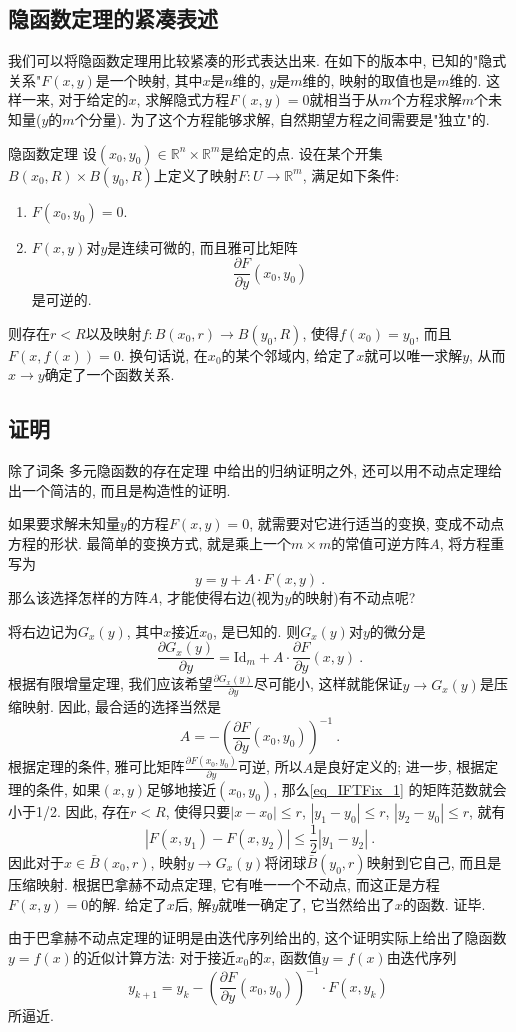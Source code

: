 

\subsection{隐函数定理的紧凑表述}
我们可以将隐函数定理用比较紧凑的形式表达出来. 在如下的版本中, 已知的"隐式关系"$F(x,y)$是一个映射, 其中$x$是$n$维的, $y$是$m$维的, 映射的取值也是$m$维的. 这样一来, 对于给定的$x$, 求解隐式方程$F(x,y)=0$就相当于从$m$个方程求解$m$个未知量($y$的$m$个分量). 为了这个方程能够求解, 自然期望方程之间需要是"独立"的.
\begin{theorem}{隐函数定理}
设$(x_0,y_0)\in\mathbb{R}^n\times\mathbb{R}^m$是给定的点. 设在某个开集$B(x_0,R)\times B(y_0,R)$上定义了映射$F:U\to\mathbb{R}^m$, 满足如下条件:
\begin{enumerate}
\item $F(x_0,y_0)=0$.
\item $F(x,y)$对$y$是连续可微的, 而且雅可比矩阵
$$
\frac{\partial F}{\partial y}(x_0,y_0)~
$$
是可逆的.
\end{enumerate}
则存在$r<R$以及映射$f:B(x_0,r)\to B(y_0,R)$, 使得$f(x_0)=y_0$, 而且$F(x,f(x))=0$. 换句话说, 在$x_0$的某个邻域内, 给定了$x$就可以唯一求解$y$, 从而$x\to y$确定了一个函数关系.
\end{theorem}

\subsection{证明}
除了词条 多元隐函数的存在定理 中给出的归纳证明之外, 还可以用不动点定理给出一个简洁的, 而且是构造性的证明.

如果要求解未知量$y$的方程$F(x,y)=0$, 就需要对它进行适当的变换, 变成不动点方程的形状. 最简单的变换方式, 就是乘上一个$m\times m$的常值可逆方阵$A$, 将方程重写为
$$
y=y+A\cdot F(x,y)~.
$$
那么该选择怎样的方阵$A$, 才能使得右边(视为$y$的映射)有不动点呢?

将右边记为$G_x(y)$, 其中$x$接近$x_0$, 是已知的. 则$G_x(y)$对$y$的微分是
\begin{equation}\label{eq_IFTFix_1}
\frac{\partial G_x(y)}{\partial y}=\mathrm{Id}_m+A\cdot\frac{\partial F}{\partial y}(x,y)~.
\end{equation}
根据有限增量定理, 我们应该希望$\frac{\partial G_x(y)}{\partial y}$尽可能小, 这样就能保证$y\to G_x(y)$是压缩映射. 因此, 最合适的选择当然是
$$
A=-\left(\frac{\partial F}{\partial y}(x_0,y_0)\right)^{-1}~.
$$
根据定理的条件, 雅可比矩阵$\frac{\partial F(x_0,y_0)}{\partial y}$可逆, 所以$A$是良好定义的; 进一步, 根据定理的条件, 如果$(x,y)$足够地接近$(x_0,y_0)$, 那么\autoref{eq_IFTFix_1} 的矩阵范数就会小于1/2. 因此, 存在$r<R$, 使得只要$|x-x_0|\leq r$, $|y_1-y_0|\leq r$, $|y_2-y_0|\leq r$, 就有
$$
|F(x,y_1)-F(x,y_2)|\leq\frac{1}{2}|y_1-y_2|~.
$$  
因此对于$x\in \bar B(x_0,r)$, 映射$y\to G_x(y)$将闭球$\bar B(y_0,r)$映射到它自己, 而且是压缩映射. 根据巴拿赫不动点定理, 它有唯一一个不动点, 而这正是方程$F(x,y)=0$的解. 给定了$x$后, 解$y$就唯一确定了, 它当然给出了$x$的函数. 证毕.

由于巴拿赫不动点定理的证明是由迭代序列给出的, 这个证明实际上给出了隐函数$y=f(x)$的近似计算方法: 对于接近$x_0$的$x$, 函数值$y=f(x)$由迭代序列
$$
y_{k+1}=y_k-\left(\frac{\partial F}{\partial y}(x_0,y_0)\right)^{-1}\cdot F(x,y_k)~
$$
所逼近.
